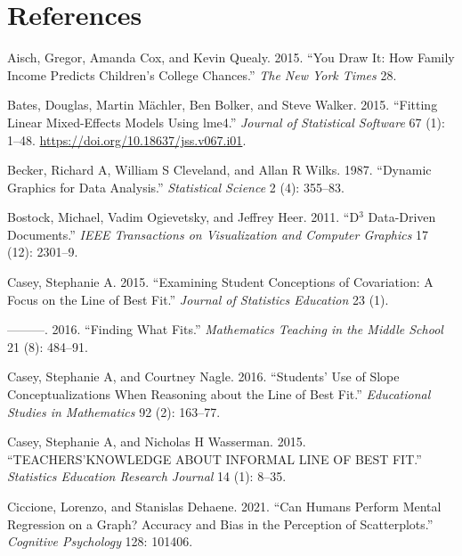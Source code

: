 \documentclass[
]{jds}
\newlength{\cslhangindent}
\newlength{\cslentryspacingunit} %
\newenvironment{CSLReferences}[2] %
 {%
  \setlength{\parindent}{0pt}
  \ifodd #1
  \let\oldpar\par
  \def\par{\hangindent=\cslhangindent\oldpar}
  \fi
  \setlength{\parskip}{#2\cslentryspacingunit}
 }%
 {}
\begin{document}
\hypertarget{references}{%
\section*{References}\label{references}}

\hypertarget{refs}{}
\begin{CSLReferences}{1}{0}
\leavevmode{}%
Aisch, Gregor, Amanda Cox, and Kevin Quealy. 2015. {``You Draw It: How
Family Income Predicts Children's College Chances.''} \emph{The New York
Times} 28.

\leavevmode{}%
Bates, Douglas, Martin Mächler, Ben Bolker, and Steve Walker. 2015.
{``Fitting Linear Mixed-Effects Models Using {lme4}.''} \emph{Journal of
Statistical Software} 67 (1): 1--48.
\url{https://doi.org/10.18637/jss.v067.i01}.

\leavevmode{}%
Becker, Richard A, William S Cleveland, and Allan R Wilks. 1987.
{``Dynamic Graphics for Data Analysis.''} \emph{Statistical Science} 2
(4): 355--83.

\leavevmode{}%
Bostock, Michael, Vadim Ogievetsky, and Jeffrey Heer. 2011. {``D\(^3\)
Data-Driven Documents.''} \emph{IEEE Transactions on Visualization and
Computer Graphics} 17 (12): 2301--9.

\leavevmode{}%
Casey, Stephanie A. 2015. {``Examining Student Conceptions of
Covariation: A Focus on the Line of Best Fit.''} \emph{Journal of
Statistics Education} 23 (1).

\leavevmode{}%
---------. 2016. {``Finding What Fits.''} \emph{Mathematics Teaching in
the Middle School} 21 (8): 484--91.

\leavevmode{}%
Casey, Stephanie A, and Courtney Nagle. 2016. {``Students' Use of Slope
Conceptualizations When Reasoning about the Line of Best Fit.''}
\emph{Educational Studies in Mathematics} 92 (2): 163--77.

\leavevmode{}%
Casey, Stephanie A, and Nicholas H Wasserman. 2015.
{``TEACHERS'KNOWLEDGE ABOUT INFORMAL LINE OF BEST FIT.''}
\emph{Statistics Education Research Journal} 14 (1): 8--35.

\leavevmode{}%
Ciccione, Lorenzo, and Stanislas Dehaene. 2021. {``Can Humans Perform
Mental Regression on a Graph? Accuracy and Bias in the Perception of
Scatterplots.''} \emph{Cognitive Psychology} 128: 101406.


\end{CSLReferences}
\end{document}
